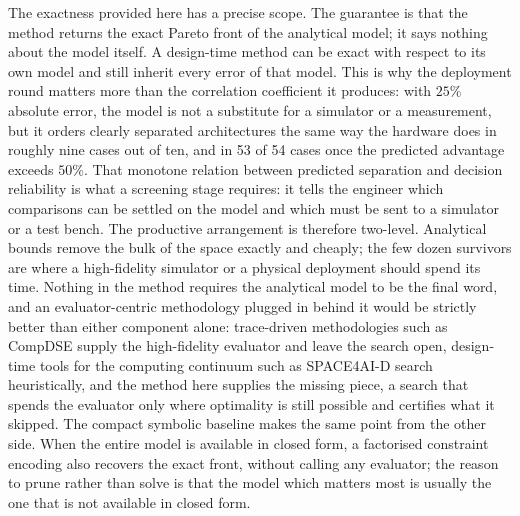 \documentclass[pdflatex,sn-nature,lineno]{sn-jnl}
\newcommand{\ReliabilityFifty}{53 of 54}
\begin{document}
The exactness provided here has a precise scope. The guarantee is that the method returns the exact Pareto front of the
analytical model; it says nothing about the model itself. A design-time method can be
exact with respect to its own model and still inherit every error of that model. This is
why the deployment round matters more than the correlation coefficient it produces: with
$25\%$ absolute error, the model is not a substitute for a simulator or a measurement,
but it orders clearly separated architectures the same way the hardware does in roughly
nine cases out of ten, and in \ReliabilityFifty{} cases once the predicted advantage exceeds
$50\%$. That monotone relation between predicted separation and decision reliability is
what a screening stage requires: it tells the engineer which comparisons can be settled on
the model and which must be sent to a simulator or a test bench. The productive
arrangement is therefore two-level. Analytical bounds remove the bulk of the space
exactly and cheaply; the few dozen survivors are where a high-fidelity simulator or a
physical deployment should spend its time. Nothing in the method requires the analytical
model to be the final word, and an evaluator-centric methodology plugged in behind it
would be strictly better than either component alone: trace-driven methodologies such as
CompDSE\cite{saadatmand2025compdse} supply the high-fidelity evaluator and leave the search
open, design-time tools for the computing continuum such as
SPACE4AI-D\cite{sedghani2024space4aid} search heuristically, and the method here supplies
the missing piece, a search that spends the evaluator only where optimality is still
possible and certifies what it skipped. The compact symbolic baseline makes the same point
from the other side. When the entire model is available in closed form, a factorised
constraint encoding also recovers the exact front, without calling any evaluator; the
reason to prune rather than solve is that the model which matters most is usually the one
that is not available in closed form.
\end{document}
